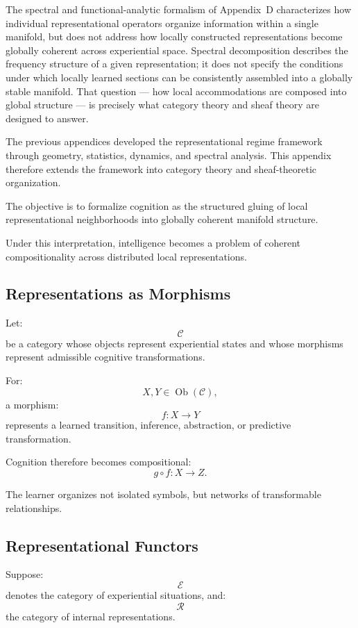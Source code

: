\documentclass[12pt,a4paper]{article}
\begin{document}
The spectral and functional-analytic formalism of Appendix~D characterizes how individual representational operators organize information within a single manifold, but does not address how locally constructed representations become globally coherent across experiential space. Spectral decomposition describes the frequency structure of a given representation; it does not specify the conditions under which locally learned sections can be consistently assembled into a globally stable manifold. That question --- how local accommodations are composed into global structure --- is precisely what category theory and sheaf theory are designed to answer.

The previous appendices developed the representational regime framework through geometry, statistics, dynamics, and spectral analysis. This appendix therefore extends the framework into category theory and sheaf-theoretic organization.

The objective is to formalize cognition as the structured gluing of local representational neighborhoods into globally coherent manifold structure.

Under this interpretation, intelligence becomes a problem of coherent compositionality across distributed local representations.

\subsection{Representations as Morphisms}

Let:
\[
\mathcal{C}
\]
be a category whose objects represent experiential states and whose morphisms represent admissible cognitive transformations.

For:
\[
X,Y
\in
\operatorname{Ob}(\mathcal{C}),
\]
a morphism:
\[
f :
X
\rightarrow
Y
\]
represents a learned transition, inference, abstraction, or predictive transformation.

Cognition therefore becomes compositional:
\[
g\circ f :
X
\rightarrow
Z.
\]

The learner organizes not isolated symbols, but networks of transformable relationships.

\subsection{Representational Functors}

Suppose:
\[
\mathcal{E}
\]
denotes the category of experiential situations,
and:
\[
\mathcal{R}
\]
the category of internal representations.
\end{document}
